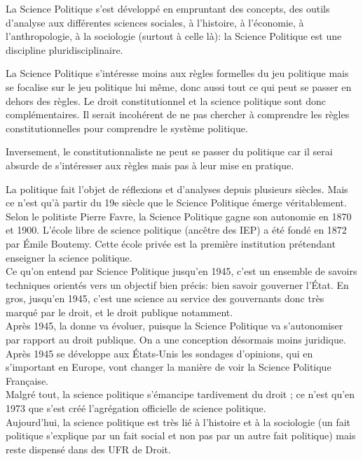 \documentclass[12pt, a4paper, openany]{book}
\begin{document}
La Science Politique s'est développé en empruntant des concepts, des outils d'analyse aux différentes sciences sociales, à l'histoire, à l'économie, à l'anthropologie, à la sociologie (surtout à celle là): la Science Politique est une discipline pluridisciplinaire.

La Science Politique s'intéresse moins aux règles formelles du jeu politique mais se focalise sur le jeu politique lui même, donc aussi tout ce qui peut se passer en dehors des règles. Le droit constitutionnel et la science politique sont donc complémentaires. Il serait incohérent de ne pas chercher à comprendre les règles constitutionnelles pour comprendre le système politique. 

Inversement, le constitutionnaliste ne peut se passer du politique car il serai absurde de s'intéresser aux règles mais pas à leur mise en pratique.


La politique fait l'objet de réflexions et d'analyses depuis plusieurs siècles. Mais ce n'est qu'à partir du 19e siècle que le Science Politique émerge véritablement. Selon le politiste Pierre Favre, la Science Politique gagne son autonomie en 1870 et 1900. L'école libre de science politique (ancêtre des IEP) a été fondé en 1872 par Émile Boutemy. Cette école privée est la première institution prétendant enseigner la science politique. \\
Ce qu'on entend par Science Politique jusqu'en 1945, c'est un ensemble de savoirs techniques orientés vers un objectif bien précis: bien savoir gouverner l'État. En gros, jusqu'en 1945, c'est une science au service des gouvernants donc très marqué par le droit, et le droit publique notamment. \\
Après 1945, la donne va évoluer, puisque la Science Politique va s'autonomiser par rapport au droit publique. On a une conception désormais moins juridique. Après 1945 se développe aux États-Unis les sondages d'opinions, qui en s'important en Europe, vont changer la manière de voir la Science Politique Française. \\
Malgré tout, la science politique s'émancipe tardivement du droit ; ce n'est qu'en 1973 que s'est créé l'agrégation officielle de science politique. \\
Aujourd'hui, la science politique est très lié à l'histoire et à la sociologie (un fait politique s'explique par un fait social et non pas par un autre fait politique) mais reste dispensé dans des UFR de Droit.
\end{document}
